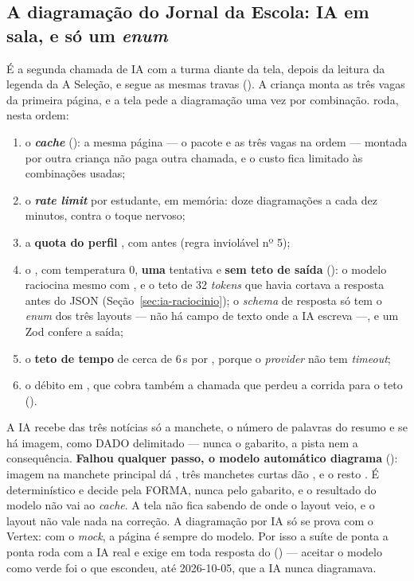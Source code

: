 \subsection{A diagramação do Jornal da Escola: IA em sala, e só um \emph{enum}}

É a segunda chamada de IA com a turma diante da tela, depois da leitura da
legenda da A Seleção, e segue as mesmas travas (). A criança monta
as três vagas da primeira página, e a tela pede a diagramação uma vez por
combinação.  roda, nesta ordem:

\begin{enumerate}
  \item o \textbf{\emph{cache}} (): a mesma página
    --- o pacote e as três vagas na ordem --- montada por outra criança não paga
    outra chamada, e o custo fica limitado às combinações usadas;
  \item o \textbf{\emph{rate limit}} por estudante, em memória: doze
    diagramações a cada dez minutos, contra o toque nervoso;
  \item a \textbf{quota do perfil }, com  antes
    (regra inviolável nº 5);
  \item o , com temperatura 0, \textbf{uma} tentativa e
    \textbf{sem teto de saída} (): o modelo raciocina mesmo com
    , e o teto de 32 \emph{tokens} que havia cortava a
    resposta antes do JSON (Seção~\ref{sec:ia-raciocinio}); o \emph{schema} de
    resposta só tem o \emph{enum} dos três layouts --- não há campo de texto
    onde a IA escreva ---, e um  Zod confere a saída;
  \item o \textbf{teto de tempo} de cerca de 6\,s por , porque o
    \emph{provider} não tem \emph{timeout};
  \item o débito em , que cobra também a chamada que perdeu a
    corrida para o teto ().
\end{enumerate}

A IA recebe das três notícias só a manchete, o número de palavras do resumo e
se há imagem, como DADO delimitado --- nunca o gabarito, a pista nem a
consequência. \textbf{Falhou qualquer passo, o modelo automático diagrama}
(): imagem na manchete principal dá , três
manchetes curtas dão , e o resto . É determinístico e
decide pela FORMA, nunca pelo gabarito, e o resultado do modelo não vai ao
\emph{cache}. A tela não fica sabendo de onde o layout veio, e o layout não vale
nada na correção. A diagramação por IA só se prova com o Vertex: com o
\emph{mock}, a página é sempre do modelo. Por isso a suíte de ponta a ponta
roda com a IA real e exige  em toda resposta do  () --- aceitar o modelo como verde foi o
que escondeu, até 2026-10-05, que a IA nunca diagramava.

